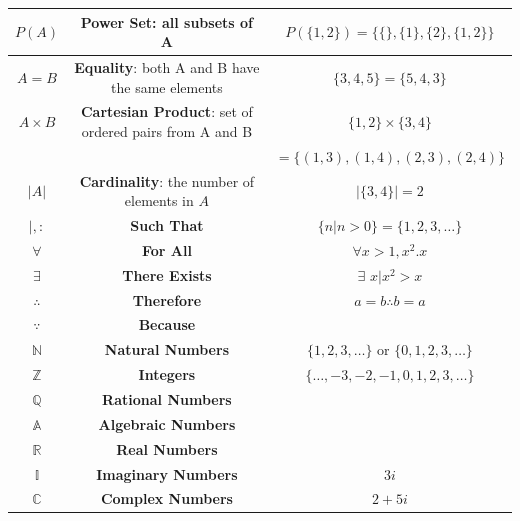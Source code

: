 \documentclass{article}
\begin{document}
\begin{center}
\begin{tabular}{|c|c|c|}
                    $P(A)$ & \textbf{Power Set}: all subsets of A & $P(\{1,2\})=\{\{\},\{1\},\{2\},\{1,2\}\}$ \\ \hline
                    $A=B$ & \textbf{Equality}: both A and B have the same elements & $\{3,4,5\}=\{5,4,3\}$ \\ \hline
                    $A\times B$ & \textbf{Cartesian Product}: set of ordered pairs from A and B & $\{1,2\}\times\{3,4\}$ \\
                    & & $=\{(1,3),(1,4),(2,3),(2,4)\}$  \\ \hline
                    $|A|$ & \textbf{Cardinality}: the number of elements in $A$ & $|\{3,4\}|=2$ \\ \hline
                    $|,:$ & \textbf{Such That} & $\{n|n>0\}=\{1,2,3,\dots\}$ \\ \hline
                    $\forall$ & \textbf{For All} & $\forall x>1,x^2.x$ \\ \hline
                    $\exists$ & \textbf{There Exists} & $\exists$  $x|x^2>x$ \\ \hline
                    $\therefore$ & \textbf{Therefore} & $a=b \therefore b =a$ \\ \hline
                    $\because$ & \textbf{Because} & \\ \hline
                    $\mathbb{N}$ & \textbf{Natural Numbers} & $\{1,2,3,\dots\}$ or $\{0,1,2,3,\dots\}$ \\ \hline
                    $\mathbb{Z}$ & \textbf{Integers} & $\{\dots,-3,-2,-1,0,1,2,3,\dots\}$ \\ \hline
                    $\mathbb{Q}$ & \textbf{Rational Numbers} & \\ \hline
                    $\mathbb{A}$ & \textbf{Algebraic Numbers} & \\ \hline
                    $\mathbb{R}$ & \textbf{Real Numbers} & \\ \hline
                    $\mathbb{I}$ & \textbf{Imaginary Numbers} & $3i$ \\ \hline
                    $\mathbb{C}$ & \textbf{Complex Numbers} & $2+5i$ \\ \hline
                \end{tabular}
            \end{center}
\end{document}
